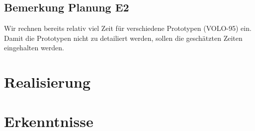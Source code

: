    	\subsection{Bemerkung Planung E2}
   	Wir rechnen bereits relativ viel Zeit für verschiedene Prototypen (VOLO-95) ein. Damit die Prototypen nicht zu detailiert werden, sollen die geschätzten Zeiten eingehalten werden.

	\section{Realisierung}
	
	\section{Erkenntnisse}